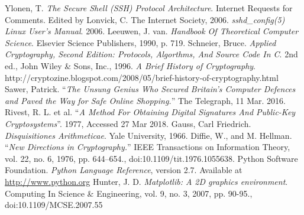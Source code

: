 \documentclass[a4paper, 12pt]{article}
\begin{document}
\pagebreak
\begin{thebibliography}{9}
Ylonen, T. \textit{The Secure Shell (SSH) Protocol Architecture}. Internet Requests for Comments. Edited by Lonvick, C.
The Internet Society, 2006.
\textit{sshd\_config(5) Linux User's Manual}. 2006.
Leeuwen, J. van. \textit{Handbook Of Theoretical Computer Science}. Elsevier Science Publishers, 1990, p. 719.
Schneier, Bruce. \textit{Applied Cryptography, Second Edition: Protocols, Algorthms, And Source Code In C}. 2nd ed., John Wiley \& Sons, Inc., 1996.
\textit{A Brief History of Cryptography}. http://cryptozine.blogspot.com/2008/05/brief-history-of-cryptography.html
Sawer, Patrick. ``\textit{The Unsung Genius Who Secured Britain's Computer Defences and Paved the Way for Safe Online Shopping.}'' The Telegraph, 11 Mar. 2016.
Rivest, R. L. et al. ``\textit{A Method For Obtaining Digital Signatures And Public-Key Cryptosystems}''. 1977, Accessed 27 Mar 2018.
Gauss, Carl Friedrich. \textit{Disquisitiones Arithmeticae}. Yale University, 1966.
Diffie, W., and M. Hellman. ``\textit{New Directions in Cryptography.}'' IEEE Transactions on Information Theory, vol. 22, no. 6, 1976, pp. 644–654., doi:10.1109/tit.1976.1055638.
Python Software Foundation. \textit{Python Language Reference}, version 2.7. Available at \url{http://www.python.org}
Hunter, J. D. \textit{Matplotlib: A 2D graphics environment}. Computing In Science \& Engineering, vol. 9, no. 3, 2007, pp. 90-95., doi:10.1109/MCSE.2007.55
\end{thebibliography}
\end{document}
